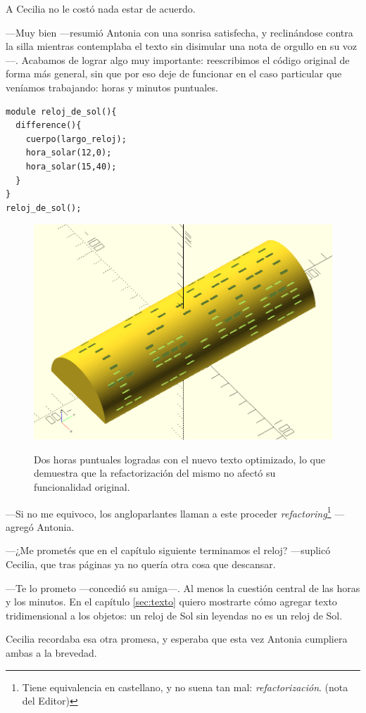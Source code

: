 A Cecilia no le costó nada estar de acuerdo.

---Muy bien ---resumió Antonia con una sonrisa satisfecha, y
reclinándose contra la silla mientras contemplaba el texto sin
disimular una nota de orgullo en su voz---. Acabamos de lograr algo
muy importante: reescribimos el código original de forma más general,
sin que por eso deje de funcionar en el caso particular que veníamos
trabajando: horas y minutos puntuales.


\begin{lstlisting}
module reloj_de_sol(){
  difference(){
    cuerpo(largo_reloj);    
    hora_solar(12,0);
    hora_solar(15,40);
  }
}
reloj_de_sol();
\end{lstlisting}%


\begin{figure}[ht]
  \centering
  \includegraphics[width=\textwidth]{imagenes/dos-horas-optimizadas}
  \caption{Dos horas puntuales logradas con el nuevo texto
    optimizado, lo que demuestra que la refactorización del mismo no
    afectó su funcionalidad original.}\iftoggle{libro}{\vspace{128in}}{}
  \label{fig:dos-horas-optimizadas}
\end{figure}

---Si no me equivoco, los angloparlantes llaman a este proceder
\emph{refactoring}\footnote{Tiene equivalencia en castellano, y no
  suena tan mal: \emph{refactorización}. (nota del Editor)} ---agregó
Antonia.

---¿Me prometés que en el capítulo siguiente terminamos el reloj?
---suplicó Cecilia, que tras
páginas ya no quería otra cosa que
descansar.\label{sec:el-reloj-de-sol-iii-b}

---Te lo prometo ---concedió su amiga---. Al menos la cuestión central
de las horas y los minutos. En el capítulo \ref{sec:texto} quiero
mostrarte cómo agregar texto tridimensional a los objetos: un reloj de
Sol sin leyendas no es un reloj de Sol.

Cecilia recordaba esa otra promesa, y esperaba que esta vez Antonia
cumpliera ambas a la brevedad.


